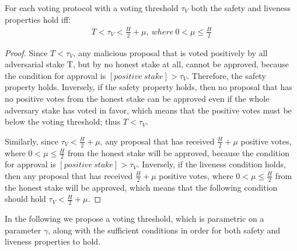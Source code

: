 \begin{theorem}\label{th:safety_and_liveness_condition}
	For each voting protocol with a voting threshold $\tau_V$ both the safety 
	and liveness properties hold iff:
	\begin{align*} 
		T < \tau_V < \frac{H}{2} + \mu,\ where\ 0 < \mu \leq \frac{H}{2}
	\end{align*}
	\begin{proof}
		Since $T < \tau_V$, any malicious proposal that is voted positively by 
		all adversarial stake T, but by no honest stake at all, cannot be 
		approved, because the condition for approval is $[positive\ stake] > 
		\tau_V$. Therefore, the safety property holds. Inversely, if the safety 
		property holds, then no proposal that has no positive votes from the 
		honest stake can be approved even if the whole adversary stake has 
		voted in favor, which means that the positive votes must be below the 
		voting threshold; thus $T < \tau_V$. 
		
		Similarly, since $\tau_V < \frac{H}{2} + \mu$, any proposal that has 
		received $\frac{H}{2}+\mu$ positive votes, where $0 < \mu \leq 
		\frac{H}{2}$ from the honest stake will be approved, because the 
		condition for approval is $[positive\ stake] > \tau_V$. Inversely, if 
		the liveness condition holds, then any proposal that has received 
		$\frac{H}{2}+\mu$ positive votes, where $0 < \mu \leq \frac{H}{2}$ from 
		the honest stake will be approved, which means that the following 
		condition should hold $\tau_V < \frac{H}{2} + \mu$.
	\end{proof}
\end{theorem}

In the following we propose a voting threshold, which is parametric on a 
parameter $\gamma$, along with the sufficient conditions in order for both 
safety and liveness properties to hold.


